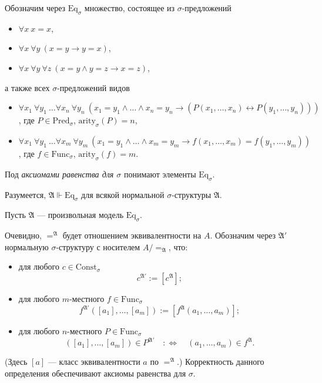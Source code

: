 \documentclass[12pt,a4paper]{article}
\newcommand{\Pred}{\ensuremath{\mathrm{Pred}}\xspace}
\newcommand{\Func}{\ensuremath{\mathrm{Func}}\xspace}
\newcommand{\Const}{\ensuremath{\mathrm{Const}}\xspace}
\newcommand{\arity}{\ensuremath{\mathrm{arity}}\xspace}
\newcommand{\Eq}{\ensuremath{\mathrm{Eq}}\xspace}
\begin{document}
    \begin{definition}
        Обозначим через $\Eq_\sigma$ множество, состоящее из $\sigma$-предложений
        \begin{itemize}
            \item $\forall x\ x = x$,
            \item $\forall x\ \forall y\ (x = y \rightarrow y = x)$,
            \item $\forall x\ \forall y\ \forall z\ (x = y \wedge y = z \rightarrow x = z)$,
        \end{itemize}
        а также всех $\sigma$-предложений видов
        \begin{itemize}
            \item $\forall x_1\ \forall y_1\ \dots \forall x_n\ \forall y_n\ (x_1 = y_1 \wedge \dots \wedge x_n = y_n \rightarrow (P(x_1, \dots, x_n) \leftrightarrow P(y_1, \dots, y_n)))$, где $P \in \Pred_\sigma$, $\arity_\sigma(P) = n$,
            \item $\forall x_1\ \forall y_1\ \dots \forall x_m\ \forall y_m\ (x_1 = y_1 \wedge \dots \wedge x_m = y_m \rightarrow f(x_1, \dots, x_m) = f(y_1, \dots, y_m))$, где $f \in \Func_\sigma$, $\arity_\sigma(f) = m$.
        \end{itemize}
        Под \emph{аксиомами равенства для $\sigma$} понимают элементы $\Eq_\sigma$.
    \end{definition}

    \begin{remark}
        Разумеется, $\mathfrak{A} \Vdash \Eq_\sigma$ для всякой нормальной $\sigma$-структуры $\mathfrak{A}$.
    \end{remark}

    \begin{definition}
        Пусть $\mathfrak{A}$ --- произвольная модель $\Eq_\sigma$.

        Очевидно, ${=}^\mathfrak{A}$ будет отношением эквивалентности на $A$. Обозначим через $\mathfrak{A}'$ нормальную $\sigma$-структуру с носителем $A/{=}_\mathfrak{A}$, что:
        \begin{itemize}
            \item для любого $c \in \Const_\sigma$
                \[c^{\mathfrak{A}'} := [c^\mathfrak{A}];\]
            \item для любого $m$-местного $f \in \Func_\sigma$
                \[f^{\mathfrak{A}'}([a_1], \dots, [a_m]) := [f^\mathfrak{A}(a_1, \dots, a_m)];\]
            \item для любого $n$-местного $P \in \Func_\sigma$
                \[([a_1], \dots, [a_m]) \in P^{\mathfrak{A}'} \quad :\Longleftrightarrow \quad (a_1, \dots, a_m) \in f^\mathfrak{A}.\]
        \end{itemize}
        (Здесь $[a]$ --- класс эквивалентности $a$ по ${=}^\mathfrak{A}$.) Корректность данного определения обеспечивают аксиомы равенства для $\sigma$.
    \end{definition}
\end{document}
